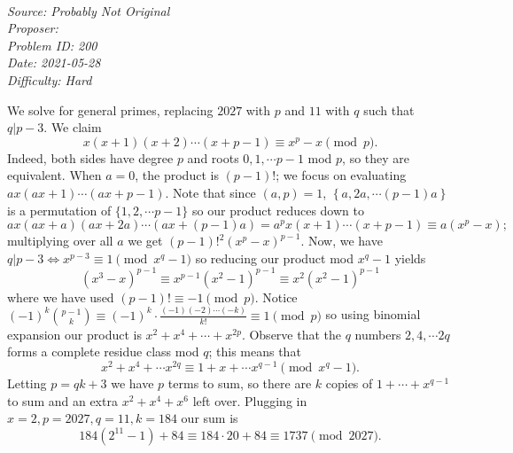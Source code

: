\SSbreak\\
\emph{Source: Probably Not Original}\\
\emph{Proposer: \Paiya}\\ %
\emph{Problem ID: 200}\\
\emph{Date: 2021-05-28}\\
\emph{Difficulty: Hard}\\
\SSbreak

\bigskip

\begin{solution}\hfil\medskip

We solve for general primes, replacing $2027$ with $p$ and $11$ with $q$ such that $q | p - 3$. 
We claim $$x(x + 1)(x + 2) \cdots (x + p - 1) \equiv x^p - x \pmod{p}.$$ 
Indeed, both sides have degree $p$ and roots $0, 1, \cdots p - 1$ mod $p$, so they are equivalent.
When $a = 0$, the product is $(p - 1)!$; we focus on evaluating $ax(ax + 1) \cdots (ax + p - 1)$. 
Note that since $(a, p) = 1$, $\left\{a, 2a, \cdots (p - 1)a\right\}$ is a permutation of $\{1, 2, \cdots p - 1\}$ so our product reduces down to
$$ax(ax + a)(ax + 2a) \cdots \left(ax + (p - 1)a\right) = a^px(x + 1) \cdots (x + p - 1) \equiv a\left(x^p - x\right);$$ multiplying over all $a$ we get
$(p - 1)!^2\left(x^p - x\right)^{p - 1}$. Now, we have $q | p - 3 \iff x^{p - 3} \equiv 1 \pmod{x^q - 1}$ so reducing our product mod $x^q - 1$ yields
$$\left(x^3 - x\right)^{p - 1} \equiv x^{p - 1}\left(x^2 - 1\right)^{p - 1} \equiv x^2\left(x^2 - 1\right)^{p - 1}$$ where we have used $(p - 1)! \equiv -1 \pmod{p}$.
Notice $(-1)^k\binom{p - 1}{k} \equiv (-1)^k \cdot \frac{(-1)(-2) \cdots (-k)}{k!} \equiv 1 \pmod{p}$ so using binomial expansion our product is 
$x^2 + x^4 + \cdots + x^{2p}$. Observe that the $q$ numbers $2, 4, \cdots 2q$ forms a complete residue class mod $q$; this means that 
$$x^2 + x^4 + \cdots x^{2q} \equiv 1 + x + \cdots x^{q - 1} \pmod{x^q - 1}.$$
Letting $p = qk + 3$ we have $p$ terms to sum, so there are $k$ copies of $1 + \cdots + x^{q - 1}$ to sum and an extra $x^2 + x^4 + x^6$ left over. 
Plugging in $x = 2, p = 2027, q = 11, k = 184$ our sum is $$184 \left(2^{11} - 1\right) + 84 \equiv 184 \cdot 20 + 84 \equiv \boxed{1737} \pmod{2027}.$$
\end{solution}\bigskip
